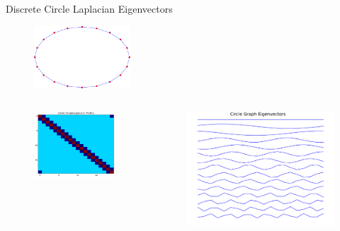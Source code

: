 \documentclass{beamer}
\begin{document}
\begin{frame}{Discrete Circle Laplacian Eigenvectors}

\begin{figure}[t]
    \includegraphics[width=0.32\textwidth]{CircleGraph.pdf}
\end{figure}

\begin{columns}
\begin{column}[T]{5cm}
\begin{figure}[t]
    \includegraphics[width=\textwidth]{CircleLaplacian.png}
\end{figure}
\end{column}
\begin{column}[T]{5cm}
\begin{figure}[t]
    \includegraphics[width=\textwidth]{CircleEigvecs.pdf}
\end{figure}
\end{column}
\end{columns}


\end{frame}
\end{document}
